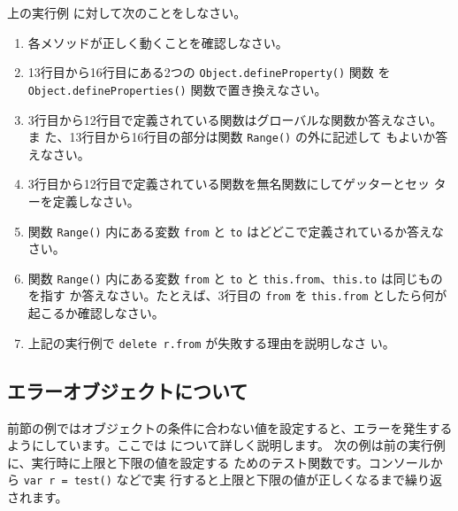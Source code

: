 \begin{Problem}
 上の実行例
 に対して次のことをしなさい。
\begin{enumerate}\upshape
 \item 各メソッドが正しく動くことを確認しなさい。
 \item 13行目から16行目にある2つの \texttt{Object.defineProperty()} 関数
       を \texttt{Object.defineProperties()} 関数で置き換えなさい。
 \item 3行目から12行目で定義されている関数はグローバルな関数か答えなさい。ま
       た、13行目から16行目の部分は関数 \texttt{Range()} の外に記述して
       もよいか答えなさい。
 \item 3行目から12行目で定義されている関数を無名関数にしてゲッターとセッ
       ターを定義しなさい。
 \item 関数 \texttt{Range()} 内にある変数 \texttt{from} と \texttt{to}
       はどどこで定義されているか答えなさい。
 \item 関数 \texttt{Range()} 内にある変数 \texttt{from} と \texttt{to}
       と \texttt{this.from}、\texttt{this.to} は同じものを指す
       か答えなさい。たとえば、3行目の \texttt{from} を \texttt{this.from}
       としたら何が起こるか確認しなさい。
 \item 上記の実行例で \texttt{delete r.from} が失敗する理由を説明しなさ
			 い。
\end{enumerate}
\end{Problem}
\subsection{エラーオブジェクトについて}
前節の例ではオブジェクトの条件に合わない値を設定すると、エラーを発生する
ようにしています。ここでは について詳しく説明します。
次の例は前の実行例に、実行時に上限と下限の値を設定する
 ためのテスト関数です。コンソールから \texttt{var r = test()} などで実
 行すると上限と下限の値が正しくなるまで繰り返されます。

